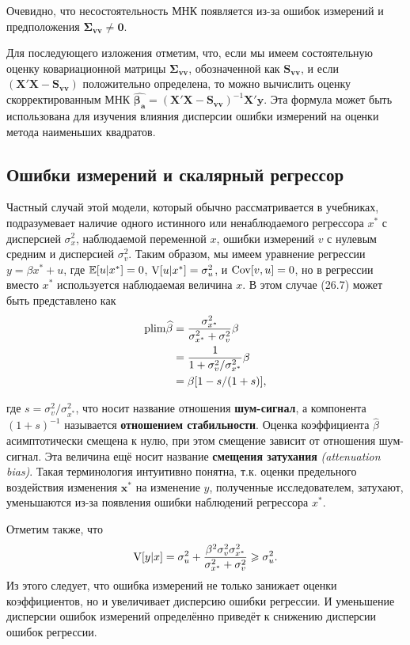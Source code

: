 Очевидно, что несостоятельность МНК появляется из-за ошибок измерений и предположения $\mathbf{\Sigma_{vv}}\neq\mathbf{0}$.

Для последующего изложения отметим, что, если мы имеем состоятельную оценку ковариационной матрицы $\mathbf{\Sigma_{vv}}$, обозначенной как $\mathbf{S_{vv}}$, и если $(\mathbf{X'X}-\mathbf{S_{vv}})$ положительно определена, то можно вычислить оценку скорректированным МНК $\mathbf{\widehat {\beta_a}}={(\mathbf{X'X}-\mathbf{S_{vv}})}^{-1}\mathbf{X'y}$. Эта формула может быть использована для изучения влияния дисперсии ошибки измерений на оценки метода наименьших квадратов.

\subsection{Ошибки измерений и скалярный регрессор}

Частный случай этой модели, который обычно рассматривается в учебниках, подразумевает наличие одного истинного или ненаблюдаемого регрессора $x^*$ с дисперсией $\sigma^2_x$, наблюдаемой переменной $x$, ошибки измерений $v$ с нулевым средним и дисперсией $\sigma^2_v$. Таким образом, мы имеем уравнение регрессии $y=\beta x^*+u$, где $\mathbb{E}[u|x^*]=0$, $\mathrm{V}[u|x^*]=\sigma^2_u$,  и $\mathrm{Cov}[v,u]=0$, но в регрессии вместо $x^*$ используется наблюдаемая величина $x$. 
В этом случае (26.7) может быть представлено как
\begin{align}
\mathrm{plim }\widehat {\beta}&=\frac{\sigma^2_{x^*}}{\sigma^2_{x^*}+\sigma^2_v}\beta \\
&=\frac{1}{1+\sigma^2_v / \sigma^2_{x^*}}\beta \notag \\
&=\beta[1-s/(1+s)], \notag 
\end{align}

где $s=\sigma^2_v / \sigma^2_{x^*}$, что носит название отношения {\bf шум-сигнал}, а компонента ${(1+s)}^{-1}$ называется {\bf отношением стабильности}. Оценка коэффициента $\widehat {\beta}$ асимптотически смещена к нулю, при этом смещение зависит  от отношения шум-сигнал. Эта величина ещё носит название {\bf смещения затухания} \emph{(attenuation bias)}. Такая терминология интуитивно понятна, т.к. оценки предельного воздействия изменения $\mathbf{x^*}$ на изменение $y$, полученные исследователем, затухают, уменьшаются из-за появления ошибки наблюдений регрессора $x^*$. 
  
Отметим также, что
\[
\mathrm{V}[y|x]=\sigma^2_u+\frac{{\beta}^2\sigma^2_v\sigma^2_{x^*}}{\sigma^2_{x^*}+\sigma^2_v}\geqslant \sigma^2_u.
\]
Из этого следует, что ошибка измерений не только занижает оценки коэффициентов, но и увеличивает дисперсию ошибки регрессии. И уменьшение дисперсии ошибок измерений определённо приведёт к снижению дисперсии ошибок регрессии.

